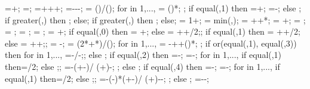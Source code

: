{{\basewallendx=\buildingwidth+\supportwidth;
\basewallendy=\basewallstarty;
\rightsoilx=\hsdistright+\supportwidth+\buildingwidth+\rightsoildist;
\rightsoily=\rightwallh-\rightsoildepth-\supportheight-\hsdistbottom;
\isospace = (\buildingwidth)/();
for \kiso in {1,...,{\numberofisolators}}{
\xiso{\kiso} = ()*\isospace;
};
if equal(\isoshiftyn,1) then
{=+\isoshift;
\xiso{\numberofisolators}=\xiso{\numberofisolators}-\isoshift;}
else {};
if greater(\doflocfloor,\storynumber) then {;} else{};
if greater(\dofloccolumn,\columnnumber) then {;} else{};
\dofloch = 1+\doflocfloor;
\minlen = min(\storyheight,\baywidth);
\dofxx = \x{\dofloccolumn}+\dofoffsetratio*\minlen+*\showdefl;
\dofyy = \y{\dofloch}+\dofoffsetratio*\minlen;
\arrlen = \arrowlenratio*\minlen;
\arrrad = \rotarrowlenratio*\minlen;
\Xaxesstarty = ;
\Yaxesstartx = ;
\Yaxesstarty = \y{\levelnumber}+\axisseperation;
if equal(\showsupports,0) then
{\Xaxesstartx = \x{\columnnumber}+\axisseperation;} else
{\Xaxesstartx = \x{\columnnumber}+\axisseperation+\supportwidth/2;};
if equal(\showsupports,1) then
{\Xaxesstartx = \x{\columnnumber}+\axisseperation+\supportwidth/2;} else
{\Xaxesstartx = \x{\columnnumber}+\axisseperation+\supportwidth;};
\pilecoordy = -\supportheight;
\pilespace = 
(2*\supportwidth+*\pilesidespace)/();
for \pileind in {1,...,{\numberofpiles}}{
\pilecoordx{\pileind} = -\supportwidth+\pilesidespace+()*\pilespace;
};
if or(equal(\latloadtype,1), equal(\latloadtype,3)) then {
for \iarr in {1,...,{\levelnumber}}{
	\arrstartx{\iarr}=-\toparrlen*\y{\iarr}/\structheight-\latloadshift;};
} else {};
if equal(\latloadtype,2) then {
	=-\latloadshift;
	=-\isomidy;
	for \iarr in {1,...,{\levelnumber}}{
		if equal(\iarr,1) then{\addtempy=\supportheight/2;} else {;};
		\arrstartx{\iarr}=-\toparrlen*(\y{\iarr}+\isomidy-\addtempy)/
		(\structheight+\isomidy)-\latloadshift;
	};
} else {};
if equal(\latloadtype,4) then {
	=-\latloadshift;
	=-\isomidy;
	for \iarr in {1,...,{\levelnumber}}{
		if equal(\iarr,1) then{\addtempy=\supportheight/2;} else {;};
		\arrstartx{\iarr}=-(\toparrlen-\basearrlen)*(\y{\iarr}+\isomidy-\addtempy)/
		(\structheight+\isomidy)-\latloadshift-\basearrlen;
	};
} else {};
\engbedrockstartx=-\leftsoildist-\engbedrockleftdist;
}}
